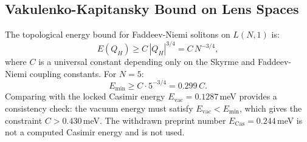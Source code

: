 \documentclass[11pt,letterpaper]{article}
\begin{document}
\subsection{Vakulenko-Kapitansky Bound on Lens Spaces}

The topological energy bound for Faddeev-Niemi solitons on $L(N,1)$ is:
\begin{equation}
E(Q_H) \geq C\, |Q_H|^{3/4} = C\, N^{-3/4},
\label{eq:VK_bound}
\end{equation}
where $C$ is a universal constant depending only on the Skyrme and Faddeev-Niemi coupling constants. For $N = 5$:
\begin{equation}
E_{\min} \geq C \cdot 5^{-3/4} = 0.299\, C.
\end{equation}
Comparing with the locked Casimir energy $E_{\mathrm{vac}} = 0.1287$\,meV provides a consistency check: the vacuum energy must satisfy $E_{\mathrm{vac}} < E_{\min}$, which gives the constraint $C > 0.430$\,meV. The withdrawn preprint number $E_{\text{Cas}}=0.244$\,meV is not a computed Casimir energy and is not used.
\end{document}
